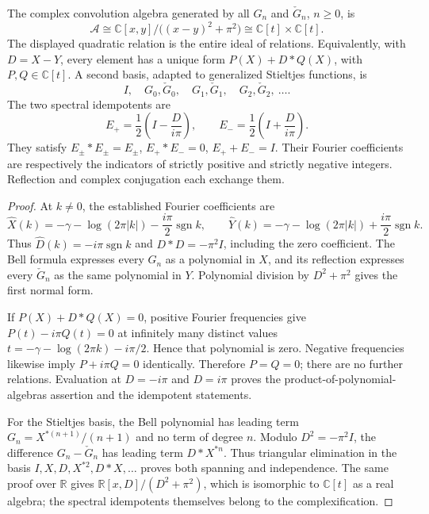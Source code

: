 \begin{theorem}\label{stref:algebra}
The complex convolution algebra generated by all $G_n$ and
$\check G_n$, $n\ge0$, is
\[
 \mathcal A\cong
 \mathbb C[x,y]/\big((x-y)^2+\pi^2\big)
 \cong\mathbb C[t]\times\mathbb C[t].
\]
The displayed quadratic relation is the entire ideal of relations.
Equivalently, with $D=X-Y$, every element has a unique form
$P(X)+D*Q(X)$, with $P,Q\in\mathbb C[t]$.
A second basis, adapted to generalized Stieltjes functions, is
\[
 I,\quad G_0,\check G_0,\quad G_1,\check G_1,\quad G_2,\check G_2,\ \ldots .
\]
The two spectral idempotents are
\[
 E_+=\frac12\left(I-\frac{D}{i\pi}\right),\qquad
 E_-=\frac12\left(I+\frac{D}{i\pi}\right).
\]
They satisfy $E_\pm*E_\pm=E_\pm$, $E_+*E_-=0$,
$E_++E_-=I$. Their Fourier coefficients are respectively the indicators
of strictly positive and strictly negative integers. Reflection and
complex conjugation each exchange them.
\end{theorem}
\begin{proof}
At $k\ne0$, the established Fourier coefficients are
\[
 \widehat X(k)=-\gamma-\log(2\pi|k|)-\frac{i\pi}{2}\operatorname{sgn}k,
 \qquad
 \widehat Y(k)=-\gamma-\log(2\pi|k|)+\frac{i\pi}{2}\operatorname{sgn}k.
\]
Thus $\widehat D(k)=-i\pi\operatorname{sgn}k$ and
$D*D=-\pi^2I$, including the zero coefficient. The Bell formula
expresses every $G_n$ as a polynomial in $X$, and its reflection
expresses every $\check G_n$ as the same polynomial in $Y$.
Polynomial division by $D^2+\pi^2$ gives the first normal form.

If $P(X)+D*Q(X)=0$, positive Fourier frequencies give
$P(t)-i\pi Q(t)=0$ at infinitely many distinct values
$t=-\gamma-\log(2\pi k)-i\pi/2$. Hence that polynomial is zero.
Negative frequencies likewise imply $P+i\pi Q=0$ identically.
Therefore $P=Q=0$; there are no further relations. Evaluation at
$D=-i\pi$ and $D=i\pi$ proves the product-of-polynomial-algebras
assertion and the idempotent statements.

For the Stieltjes basis, the Bell polynomial has leading term
$G_n=X^{*(n+1)}/(n+1)$ and no term of degree $n$.
Modulo $D^2=-\pi^2I$, the difference
$G_n-\check G_n$ has leading term $D*X^{*n}$.
Thus triangular elimination in the basis
$I,X,D,X^{*2},D*X,\ldots$ proves both spanning and independence.
The same proof over $\mathbb R$ gives
$\mathbb R[x,D]/(D^2+\pi^2)$, which is isomorphic to
$\mathbb C[t]$ as a real algebra; the spectral idempotents themselves
belong to the complexification.
\end{proof}

